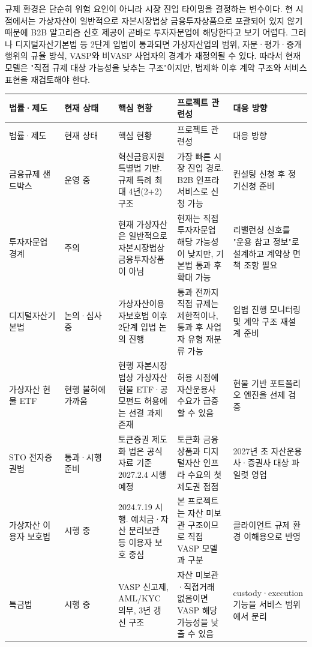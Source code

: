 \documentclass[12pt,a4paper]{article}
\begin{document}
규제 환경은 단순히 위험 요인이 아니라 시장 진입 타이밍을 결정하는 변수이다. 현 시점에서는 가상자산이 일반적으로 자본시장법상 금융투자상품으로 포괄되어 있지 않기 때문에 B2B 알고리즘 신호 제공이 곧바로 투자자문업에 해당한다고 보기 어렵다. 그러나 디지털자산기본법 등 2단계 입법이 통과되면 가상자산업의 범위, 자문·평가·중개 행위의 규율 방식, VASP와 비VASP 사업자의 경계가 재정의될 수 있다. 따라서 현재 모델은 "직접 규제 대상 가능성을 낮추는 구조"이지만, 법제화 이후 계약 구조와 서비스 표현을 재검토해야 한다.

\begin{center}
\scriptsize
\begin{longtable}{@{}p{0.20\linewidth}p{0.20\linewidth}p{0.20\linewidth}p{0.20\linewidth}p{0.20\linewidth}@{}}
\toprule
법률·제도 & 현재 상태 & 핵심 현황 & 프로젝트 관련성 & 대응 방향 \\
\midrule
\endfirsthead
\toprule
법률·제도 & 현재 상태 & 핵심 현황 & 프로젝트 관련성 & 대응 방향 \\
\midrule
\endhead
금융규제 샌드박스 & 운영 중 & 혁신금융지원 특별법 기반. 규제 특례 최대 4년(2+2) 구조 & 가장 빠른 시장 진입 경로. B2B 인프라 서비스로 신청 가능 & 컨설팅 신청 후 정기신청 준비 \\
투자자문업 경계 & 주의 & 현재 가상자산은 일반적으로 자본시장법상 금융투자상품이 아님 & 현재는 직접 투자자문업 해당 가능성이 낮지만, 기본법 통과 후 확대 가능 & 리밸런싱 신호를 "운용 참고 정보"로 설계하고 계약상 면책 조항 필요 \\
디지털자산기본법 & 논의·심사 중 & 가상자산이용자보호법 이후 2단계 입법 논의 진행 & 통과 전까지 직접 규제는 제한적이나, 통과 후 사업자 유형 재분류 가능 & 입법 진행 모니터링 및 계약 구조 재설계 준비 \\
가상자산 현물 ETF & 현행 불허에 가까움 & 현행 자본시장법상 가상자산 현물 ETF·공모펀드 허용에는 선결 과제 존재 & 허용 시점에 자산운용사 수요가 급증할 수 있음 & 현물 기반 포트폴리오 엔진을 선제 검증 \\
STO 전자증권법 & 통과·시행 준비 & 토큰증권 제도화 법은 공식 자료 기준 2027.2.4 시행 예정 & 토큰화 금융상품과 디지털자산 인프라 수요의 첫 제도권 접점 & 2027년 초 자산운용사·증권사 대상 파일럿 영업 \\
가상자산 이용자 보호법 & 시행 중 & 2024.7.19 시행. 예치금·자산 분리보관 등 이용자 보호 중심 & 본 프로젝트는 자산 미보관 구조이므로 직접 VASP 모델과 구분 & 클라이언트 규제 환경 이해용으로 반영 \\
특금법 & 시행 중 & VASP 신고제, AML/KYC 의무, 3년 갱신 구조 & 자산 미보관·직접거래 없음이면 VASP 해당 가능성을 낮출 수 있음 & custody·execution 기능을 서비스 범위에서 분리 \\
\bottomrule
\end{longtable}
\end{center}
\end{document}
